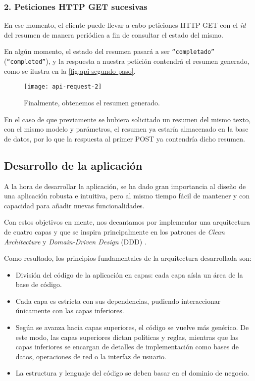 \subsubsection{2. Peticiones HTTP GET sucesivas}

En ese momento, el cliente puede llevar a cabo peticiones HTTP GET con el \emph{id} del resumen de manera periódica a fin de consultar el estado del mismo.

En algún momento, el estado del resumen pasará a ser \texttt{``completado''} (\texttt{``completed''}), y la respuesta a nuestra petición contendrá el resumen generado, como se ilustra en la \autoref{fig:api-segundo-paso}.

\begin{figure}[h]
	\centering
	\texttt{[image: api-request-2]}
	\caption{Finalmente, obtenemos el resumen generado.}
	\label{fig:api-segundo-paso}
\end{figure}

En el caso de que previamente se hubiera solicitado un resumen del mismo texto, con el mismo modelo y parámetros, el resumen ya estaría almacenado en la base de datos, por lo que la respuesta al primer POST ya contendría dicho resumen.

\newpage

\subsection{Desarrollo de la aplicación}

A la hora de desarrollar la aplicación, se ha dado gran importancia al diseño de una aplicación robusta e intuitiva, pero al mismo tiempo fácil de mantener y con capacidad para añadir nuevas funcionalidades.

Con estos objetivos en mente, nos decantamos por implementar una arquitectura de cuatro capas y que se inspira principalmente en los patrones de \emph{Clean Architecture} \cite{martin15} y \emph{Domain-Driven Design} (DDD) \cite{vernon13}.

Como resultado, los principios fundamentales de la arquitectura desarrollada son:

\begin{itemize} [\textbullet]
	\item División del código de la aplicación en capas: cada capa aísla un área de la base de código.
	
	\item Cada capa es estricta con sus dependencias, pudiendo interaccionar únicamente con las capas inferiores.
	
	\item Según se avanza hacia capas superiores, el código se vuelve más genérico. De este modo, las capas superiores dictan políticas y reglas, mientras que las capas inferiores se encargan de detalles de implementación como bases de datos, operaciones de red o la interfaz de usuario.
	
	\item La estructura y lenguaje del código se deben basar en el dominio de negocio.
\end{itemize}

